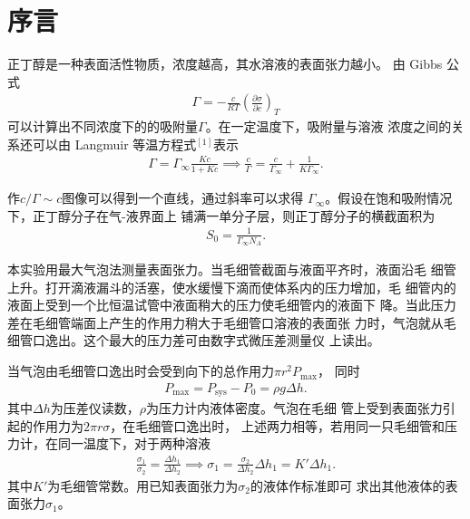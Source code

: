 \documentclass[12pt]{ctexart}
\numberwithin{equation}{section}
\begin{document}
\section{序言}

正丁醇是一种表面活性物质，浓度越高，其水溶液的表面张力越小。
由 Gibbs 公式
\begin{align}
    \Gamma = -\frac{c}{RT}
    \left(\frac{\partial\sigma}{\partial c}\right)_T
\end{align}
可以计算出不同浓度下的的吸附量$\Gamma$。在一定温度下，吸附量与溶液
浓度之间的关系还可以由 Langmuir 等温方程式$^{[1]}$表示
\begin{align}
    \Gamma = \Gamma_\infty\frac{Kc}{1+Kc} \implies
    \frac{c}{\Gamma} = \frac{c}{\Gamma_\infty}
        + \frac{1}{K\Gamma_\infty}.
\end{align}

作$c/\Gamma\sim c$图像可以得到一个直线，通过斜率可以求得
$\Gamma_\infty$。假设在饱和吸附情况下，正丁醇分子在气-液界面上
铺满一单分子层，则正丁醇分子的横截面积为
\begin{align}
    S_0 = \frac{1}{\Gamma_\infty N_A}.
\end{align}

本实验用最大气泡法测量表面张力。当毛细管截面与液面平齐时，液面沿毛
细管上升。打开滴液漏斗的活塞，使水缓慢下滴而使体系内的压力增加，毛
细管内的液面上受到一个比恒温试管中液面稍大的压力使毛细管内的液面下
降。当此压力差在毛细管端面上产生的作用力稍大于毛细管口溶液的表面张
力时，气泡就从毛细管口逸出。这个最大的压力差可由数字式微压差测量仪
上读出。

当气泡由毛细管口逸出时会受到向下的总作用力$\pi r^2 P_\text{max}$，
同时
\begin{align}
    P_{\text{max}} = P_{\text{sys}} - P_0 = \rho g\Delta h.
\end{align}
其中$\Delta h$为压差仪读数，$\rho$为压力计内液体密度。气泡在毛细
管上受到表面张力引起的作用力为$2\pi r \sigma$，在毛细管口逸出时，
上述两力相等，若用同一只毛细管和压力计，在同一温度下，对于两种溶液
\begin{align}
    \frac{\sigma_1}{\sigma_2} = \frac{\Delta h_1}{\Delta h_2}
    \implies \sigma_1 = \frac{\sigma_2}{\Delta h_2}\Delta h_1
    = K' \Delta h_1.
\end{align}
其中$K'$为毛细管常数。用已知表面张力为$\sigma_2$的液体作标准即可
求出其他液体的表面张力$\sigma_1$。
\end{document}
